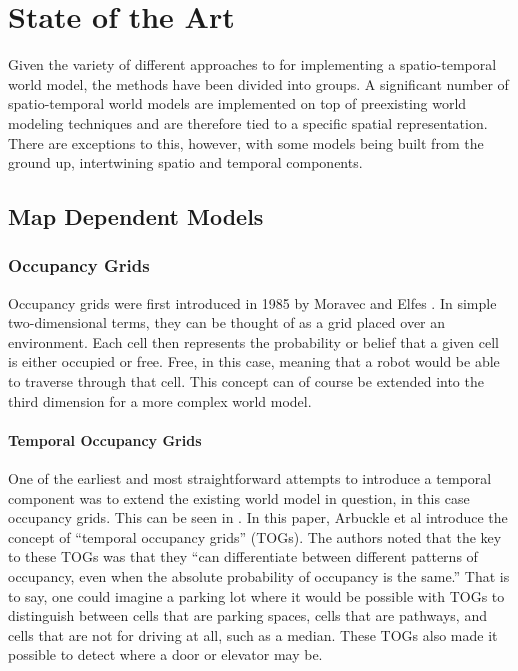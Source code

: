 
  \chapter{ State of the Art }

  Given the variety of different approaches to for implementing a spatio-temporal
  world model, the methods have been divided into groups. A significant number of spatio-temporal
  world models are implemented on top of preexisting world modeling techniques
  and are therefore tied to a specific spatial
  representation. There are exceptions to this, however, with some models
  being built from the ground up, intertwining spatio and temporal components.
  \\

  \section{ Map Dependent Models }

  \subsection{ Occupancy Grids }

  Occupancy grids were first introduced in 1985 by Moravec and Elfes\cite{Elfes1985} .
  In simple two-dimensional terms, they can be thought of as a grid placed
  over an environment. Each cell then represents the probability or belief that
  a given cell is either occupied or free. Free, in this case, meaning
  that a robot would be able to traverse through that cell. This concept can of
  course be extended into the third dimension for a more complex world model. \\

  \subsubsection{ Temporal Occupancy Grids }
  One of the earliest and most straightforward attempts to introduce a temporal
  component was to extend the existing world model in question, in this case occupancy
  grids. This can be seen in \cite{Arbuckle2002}.
  In this paper, Arbuckle et al introduce the concept of
  ``temporal occupancy grids'' (TOGs). The authors noted that the key to these TOGs
  was that they ``can differentiate between different patterns of occupancy, even
  when the absolute probability of occupancy is the same.'' That is to say, one
  could imagine a parking lot where it would be possible with TOGs to distinguish
  between cells that are parking spaces, cells that are pathways, and cells that
  are not for driving at all, such as a median. These TOGs also made it
  possible to detect where a door or elevator may be. \\

